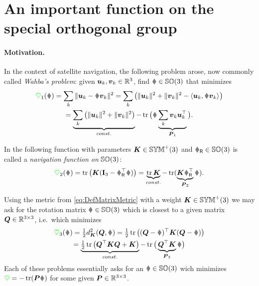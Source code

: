 \section{An important function on the special orthogonal group}\label{sec:AppendixAttitudePotential}
\paragraph{Motivation.}
In the context of satellite navigation, the following problem \cite{Wahba:WahbaProblem} arose, now commonly called \textit{Wahba's problem}: given $\boldsymbol{u}_k, \boldsymbol{v}_k \in \mathbb{R}^3$, find $\R \in \SpecialOrthogonalGroup(3)$ that minimizes
\begin{multline}
 \potentialEnergy_1(\R) = \sum_k \norm{\tuple{u}_k - \R \tuple{v}_k}^2
 = \sum_k \big( \norm{\tuple{u}_k}^2 + \norm{\tuple{v}_k}^2 - \sProd{\tuple{u}_k}{\R \tuple{v}_k} \big)
\\
 = \underbrace{\sum_k \big( \norm{\tuple{u}_k}^2 + \norm{\tuple{v}_k}^2 \big)}_{\const} - \tr\big( \R \underbrace{\sum_k \tuple{v}_k \tuple{u}_k^\top}_{\mat{P}_1} \big).
\end{multline}

In \cite{Koditschek:TotalEnergy} the following function with parameters $\boldsymbol{K}\in\mathbb{SYM}^{+}(3)$ and $\RR\in\SpecialOrthogonalGroup(3)$ is called a \textit{navigation function on} $\mathbb{SO}(3)$:
\begin{align}
 \potentialEnergy_2(\R) = \tr\big(\mat{K}(\idMat[3] - \RR^\top\R)\big) = \underbrace{\tr\mat{K}}_{\const} - \tr(\underbrace{\mat{K}\RR^\top}_{\mat{P}_2}\R).
\end{align}

Using the metric from \eqref{eq:DefMatrixMetric} with a weight $\boldsymbol{K}\in\mathbb{SYM}^{+}(3)$ we may ask for the rotation matrix $\R \in \SpecialOrthogonalGroup(3)$ which is closest to a given matrix $\boldsymbol{Q}\in\mathbb{R}^{3\times3}$, i.e.\ which minimizes
\begin{multline}
 \potentialEnergy_3(\R) = \tfrac{1}{2} \metricSq[\mat{K}]{\mat{Q}}{\R} 
 = \tfrac{1}{2} \tr\big( (\mat{Q}-\R)^\top \mat{K} (\mat{Q}-\R) \big)
\\
 = \underbrace{\tfrac{1}{2} \tr\big( \mat{Q}^\top \mat{K} \mat{Q} + \mat{K} \big)}_{\const} - \tr\big( \underbrace{\mat{Q}^\top \mat{K}}_{\mat{P}_3} \R \big)
\end{multline}
Each of these problems essentially asks for an $\R\in\SpecialOrthogonalGroup(3)$ wich minimizes $\potentialEnergy = -\tr(\mat{P} \R)$ for some given $\boldsymbol{P}\in\mathbb{R}^{3\times3}$.

